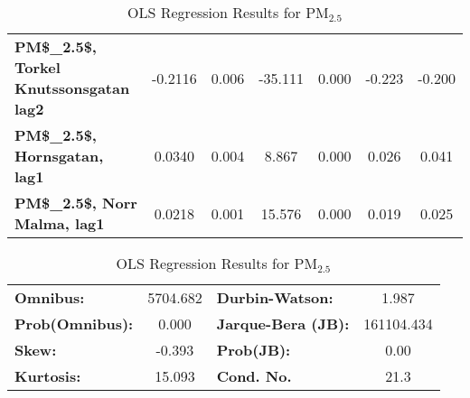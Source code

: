 \begin{landscape}
\begin{table}[h]
\begin{center}
\begin{tabular}{lcccccc}
\textbf{PM\$\_{2.5}\$, Torkel Knutssonsgatan lag2} &      -0.2116  &        0.006     &   -35.111  &         0.000        &       -0.223    &       -0.200     \\
\textbf{PM\$\_{2.5}\$, Hornsgatan, lag1}           &       0.0340  &        0.004     &     8.867  &         0.000        &        0.026    &        0.041     \\
\textbf{PM\$\_{2.5}\$, Norr Malma, lag1}           &       0.0218  &        0.001     &    15.576  &         0.000        &        0.019    &        0.025     \\
\bottomrule
\end{tabular}
\begin{tabular}{lclc}
\textbf{Omnibus:}       & 5704.682 & \textbf{  Durbin-Watson:     } &     1.987   \\
\textbf{Prob(Omnibus):} &   0.000  & \textbf{  Jarque-Bera (JB):  } & 161104.434  \\
\textbf{Skew:}          &  -0.393  & \textbf{  Prob(JB):          } &      0.00   \\
\textbf{Kurtosis:}      &  15.093  & \textbf{  Cond. No.          } &      21.3   \\
\bottomrule
\end{tabular}
\caption{OLS Regression Results for PM$_{2.5}$}
\end{center}
\end{table}
\end{landscape}
